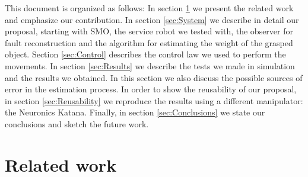 \documentclass[conference,letterpaper]{ieeeconf}
\begin{document}
This document is organized as follows: In section \ref{sec:RelatedWork} we present the related work and emphasize our contribution. In section \ref{sec:System} we describe in detail our proposal, starting with SMO, the service robot we tested with, the observer for fault reconstruction and the algorithm for estimating the weight of the grasped object. Section \ref{sec:Control} describes the control law we used to perform the movements. In section \ref{sec:Results} we describe the tests we made in simulation and the results we obtained. In this section we also discuss the possible sources of error in the estimation process. In order to show the reusability of our proposal, in section \ref{sec:Reusability} we reproduce the results using a different manipulator: the Neuronics Katana. Finally, in section \ref{sec:Conclusions} we state our conclusions and sketch the future work.

\section{Related work}
\label{sec:RelatedWork}
\end{document}
